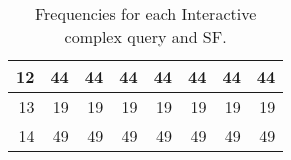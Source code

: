 \begin{table}[htb]
\begin{tabular}{|r|r|r|r|r|r|r|r|}
        \hline
        12             & 44           & 44           & 44            & 44            & 44             & 44             & 44                         \\
        \hline
        13             & 19           & 19           & 19            & 19            & 19             & 19             & 19                         \\
        \hline
        14             & 49           & 49           & 49            & 49            & 49             & 49             & 49                         \\
        \hline
    \end{tabular}
    \caption{Frequencies for each Interactive complex query and SF.}
    \label{table:freqs}
\end{table}
